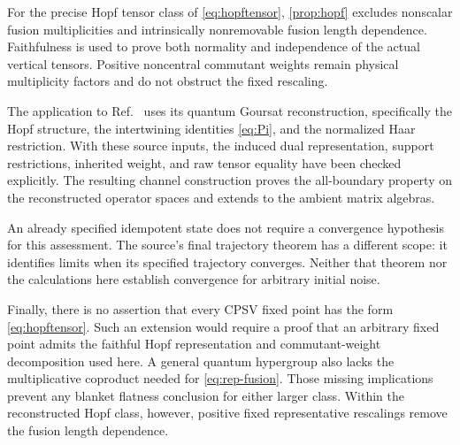 \documentclass[aps,pra,reprint,nofootinbib,onecolumn]{revtex4-2}
\begin{document}
For the precise Hopf tensor class of \cref{eq:hopftensor},
\cref{prop:hopf} excludes nonscalar fusion multiplicities and
intrinsically nonremovable fusion length dependence. Faithfulness
is used to prove both normality and independence of the actual
vertical tensors. Positive noncentral commutant weights remain
physical multiplicity factors and do not obstruct the fixed
rescaling.

The application to Ref.~\cite{Goursat} uses its quantum Goursat
reconstruction, specifically the Hopf structure, the intertwining
identities \cref{eq:Pi}, and the normalized Haar restriction.
With these source inputs, the induced dual representation, support
restrictions, inherited weight, and raw tensor equality have been
checked explicitly. The resulting channel construction proves the
all-boundary property on the reconstructed operator spaces and
extends to the ambient matrix algebras.

An already specified idempotent state does not require a convergence
hypothesis for this assessment. The source's final trajectory theorem
has a different scope: it identifies limits when its specified
trajectory converges. Neither that theorem nor the calculations here
establish convergence for arbitrary initial noise.

Finally, there is no assertion that every CPSV fixed point has the
form \cref{eq:hopftensor}. Such an extension would require a proof
that an arbitrary fixed point admits the faithful Hopf representation
and commutant-weight decomposition used here. A general quantum
hypergroup also lacks the multiplicative coproduct needed for
\cref{eq:rep-fusion}. Those missing implications prevent any blanket
flatness conclusion for either larger class. Within the reconstructed
Hopf class, however, positive fixed representative rescalings remove
the fusion length dependence.


\end{document}
